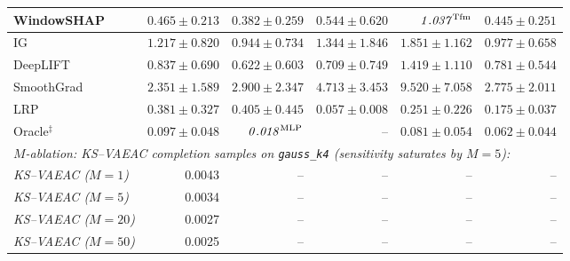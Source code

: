\begin{table}[t]
\begin{tabular}{lrrrrr}
WindowSHAP & $0.465\!\pm\!0.213$ & $0.382\!\pm\!0.259$ & $0.544\!\pm\!0.620$ & $\mathit{1.037}^{\rm Tfm}$ & $0.445\!\pm\!0.251$ \\
\midrule
IG & $1.217\!\pm\!0.820$ & $0.944\!\pm\!0.734$ & $1.344\!\pm\!1.846$ & $1.851\!\pm\!1.162$ & $0.977\!\pm\!0.658$ \\
DeepLIFT & $0.837\!\pm\!0.690$ & $0.622\!\pm\!0.603$ & $0.709\!\pm\!0.749$ & $1.419\!\pm\!1.110$ & $0.781\!\pm\!0.544$ \\
SmoothGrad & $2.351\!\pm\!1.589$ & $2.900\!\pm\!2.347$ & $4.713\!\pm\!3.453$ & $9.520\!\pm\!7.058$ & $2.775\!\pm\!2.011$ \\
LRP & $0.381\!\pm\!0.327$ & $0.405\!\pm\!0.445$ & $0.057\!\pm\!0.008$ & $0.251\!\pm\!0.226$ & $0.175\!\pm\!0.037$ \\
\midrule
Oracle$^{\ddagger}$ & $0.097\!\pm\!0.048$ & $\mathit{0.018}^{\rm MLP}$ & -- & $0.081\!\pm\!0.054$ & $0.062\!\pm\!0.044$ \\
\midrule
\multicolumn{6}{l}{\footnotesize\itshape $M$-ablation: KS--VAEAC completion samples on \texttt{gauss\_k4} (sensitivity saturates by $M{=}5$):} \\
\textit{KS--VAEAC ($M{=}1$)} & 0.0043 & -- & -- & -- & -- \\
\textit{KS--VAEAC ($M{=}5$)} & 0.0034 & -- & -- & -- & -- \\
\textit{KS--VAEAC ($M{=}20$)} & 0.0027 & -- & -- & -- & -- \\
\textit{KS--VAEAC ($M{=}50$)} & 0.0025 & -- & -- & -- & -- \\
\bottomrule
\end{tabular}
\end{table}
